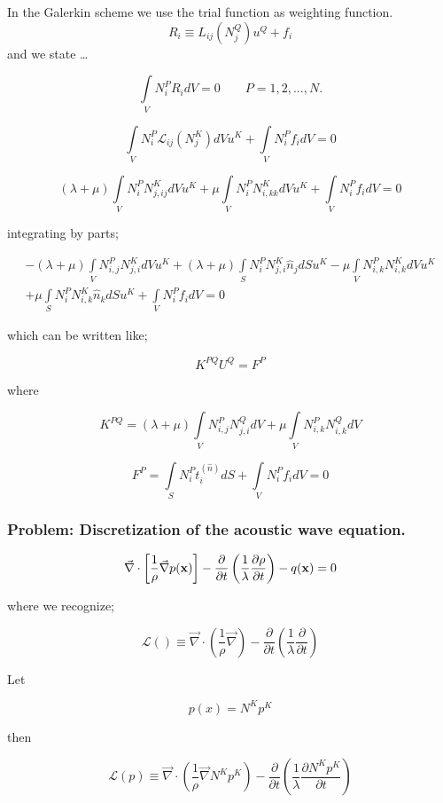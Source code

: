 In the Galerkin scheme we use the trial function as weighting function.
\[R_i \equiv L_{ij}(N_j^Q) u^Q + f_i\]
and we state \dots

\[\int\limits_V {N_i^P{R_i}dV = 0} \quad \quad P=1,2,...,N. \]

\[\int\limits_V {N_i^P{\mathcal{L}_{ij}}(N_j^K)dV{u^K}}  + \int\limits_V {N_i^P{f_i}dV = 0} \]

\[(\lambda  + \mu )\int\limits_V {N_i^PN_{j,ij}^KdV{u^K}}  + \mu \int\limits_V {N_i^PN_{i,kk}^KdV{u^K}}  + \int\limits_V {N_i^P{f_i}dV = 0} \]

integrating by parts;

\begin{align*}
- (\lambda  + \mu )\int\limits_V {N_{i,j}^PN_{j,i}^KdV{u^K} + (\lambda  + \mu )\int\limits_S {N_i^PN_{j,i}^K{{\hat n}_j}dS{u^K} - \mu \int\limits_V {N_{i,k}^PN_{i,k}^KdV{u^K}} } } \\
+ \mu \int\limits_S {N_i^PN_{i,k}^K{{\hat n}_k}dS{u^K}}  + \int\limits_V {N_i^P{f_i}dV = 0}
\end{align*}

which can be written like;


\[{K^{PQ}}{U^Q} = {F^P}\]

where

\[{K^{PQ}} = (\lambda  + \mu )\int\limits_V {N_{i,j}^PN_{j,i}^QdV}  + \mu \int\limits_V {N_{i,k}^PN_{i,k}^QdV} \]

\[{F^P} = \int\limits_S {N_i^Pt_i^{(\hat n)}dS + \int\limits_V {N_i^P{f_i}dV = 0} } \]

\subsubsection*{Problem: Discretization of the acoustic wave equation.}

\[\vec \nabla  \cdot \left[ {\frac{1}{\rho }\vec \nabla p(\vb{x})} \right] - \frac{\partial }{{\partial t}}\left( {\frac{1}{\lambda }\frac{{\partial \rho }}{{\partial t}}} \right) - q(\vb{x}) = 0\]

where we recognize;

\[\mathcal{L}() \equiv \vec \nabla  \cdot \left( {\frac{1}{\rho }\vec \nabla } \right) - \frac{\partial }{{\partial t}}\left( {\frac{1}{\lambda }\frac{\partial }{{\partial t}}} \right)\]

Let

\[p(x) = {N^K}{p^K}\]

then

\[\mathcal{L}(p) \equiv \vec \nabla  \cdot \left( {\frac{1}{\rho }\vec \nabla {N^K}{p^K}} \right) - \frac{\partial }{{\partial t}}\left( {\frac{1}{\lambda }\frac{{\partial {N^K}{p^K}}}{{\partial t}}} \right)\]


